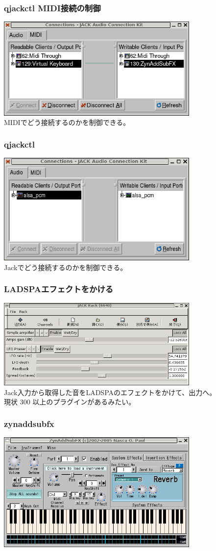 \documentclass[cjk,dvipdfmx]{beamer}
\begin{document}
\begin{frame}
 \frametitle{qjackctl MIDI接続の制御}
 \includegraphics[width=10cm]{image200602/qjackctl-midi.png}\\
 MIDIでどう接続するのかを制御できる。
\end{frame}

\begin{frame}
 \frametitle{qjackctl}
\includegraphics[width=10cm]{image200602/qjackctl-2.png}\\
 Jackでどう接続するのかを制御できる。
\end{frame}

\begin{frame}
 \frametitle{LADSPAエフェクトをかける}
\includegraphics[width=10cm]{image200602/jack-rack.png}\\
Jack入力から取得した音をLADSPAのエフェクトをかけて、出力へ。\\
現状 300 以上のプラグインがあるみたい。
\end{frame}

\begin{frame}
 \frametitle{zynaddsubfx}
\includegraphics[width=10cm]{image200602/zynaddsubfx.png}
\end{frame}
\end{document}
